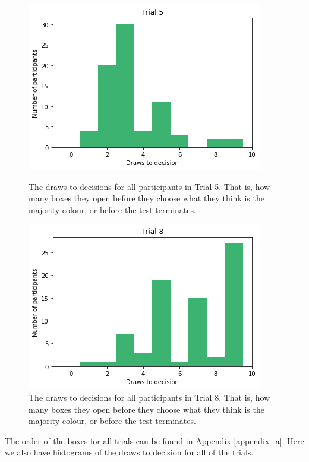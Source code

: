 \begin{figure}
    \centering
    \begin{minipage}{0.45\textwidth}
        \centering
        \includegraphics[scale=0.4]{pictures/dtd5_histogram.png}
        \caption[Draws to Decisions in Trial 5]{The draws to decisions for all participants in Trial 5. That is, how many boxes they open before they choose what they think is the majority colour, or before the test terminates.}
        \label{fig:histogram_trial5}
    \end{minipage}\hfill
    \begin{minipage}{0.45\textwidth}
        \centering
        \includegraphics[scale=0.4]{pictures/dtd8_histogram.png}
        \caption[Draws to Decisions in Trial 8]{The draws to decisions for all participants in Trial 8. That is, how many boxes they open before they choose what they think is the majority colour, or before the test terminates.}
        \label{fig:histogram_trial8}
    \end{minipage}
\end{figure}

The order of the boxes for all trials can be found in Appendix \ref{appendix_a}. Here we also have histograms of the draws to decision for all of the trials.

